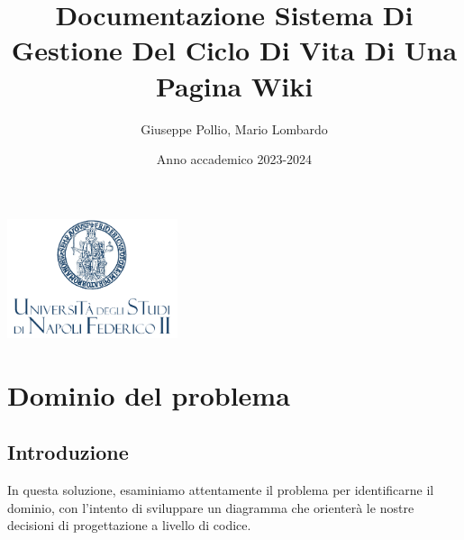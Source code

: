 \documentclass{article}
\title{Documentazione Sistema Di Gestione Del Ciclo Di Vita Di Una Pagina Wiki}
\author{Giuseppe Pollio, Mario Lombardo}
\date{Anno accademico 2023-2024}
\renewcommand{\maketitle}{%
	\begin{titlepage}
		\centering
		\includegraphics[width=5cm]{logo_uni.png}\par\vspace{1cm}
		\huge\bfseries\thetitle\par
		\vspace{1cm}
		\Large\theauthor\par
		\vfill
		\large\thedate\par
	\end{titlepage}
}
\begin{document}
	
	\maketitle
	
	\tableofcontents
	
	\newpage
	
	\section{Dominio del problema}
	\subsection{Introduzione}
	In questa soluzione, esaminiamo attentamente il problema per identificarne il dominio, con l'intento di sviluppare un diagramma che orienterà le nostre decisioni di progettazione a livello di codice.
\end{document}
